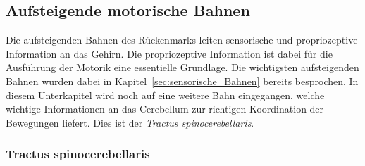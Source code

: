
\subsection{Aufsteigende motorische Bahnen}
Die aufsteigenden Bahnen des Rückenmarks leiten sensorische und propriozeptive Information an das Gehirn. Die propriozeptive Information ist dabei für die Ausführung der Motorik eine essentielle Grundlage. Die wichtigsten aufsteigenden Bahnen wurden dabei in Kapitel~\ref{sec:sensorische_Bahnen} bereits besprochen. In diesem Unterkapitel wird noch auf eine weitere Bahn eingegangen, welche wichtige Informationen an das Cerebellum zur richtigen Koordination der Bewegungen liefert. Dies ist der \textit{Tractus spinocerebellaris}. 

\subsubsection{Tractus spinocerebellaris}  \label{subsub:spinocerebellaris}

